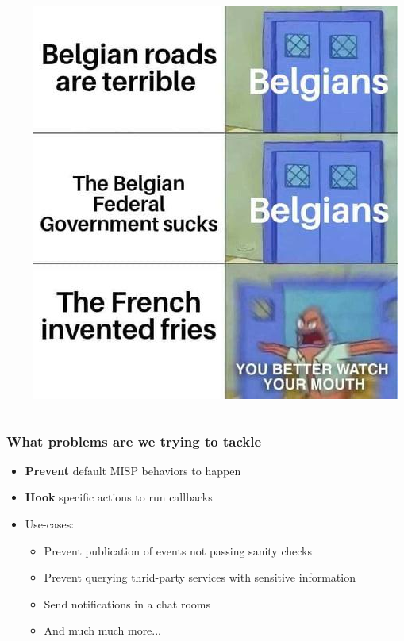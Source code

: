 \begin{frame}
    \begin{columns}
        \begin{column}{0.65\textwidth}
        \end{column}
        \begin{column}{0.35\textwidth}
            \includegraphics[width=1.0\linewidth]{pictures/belgian-joke.jpeg}
        \end{column}
    \end{columns}
\end{frame}

\begin{frame}
    \frametitle{What problems are we trying to tackle}
    \begin{itemize}
        \item \textbf{Prevent} default MISP behaviors to happen
        \item \textbf{Hook} specific actions to run callbacks
        \item Use-cases:
        \begin{itemize}
            \item Prevent publication of events not passing sanity checks
            \item Prevent querying thrid-party services with sensitive information
            \item Send notifications in a chat rooms
            \item And much much more...
        \end{itemize}
    \end{itemize}
\end{frame}

